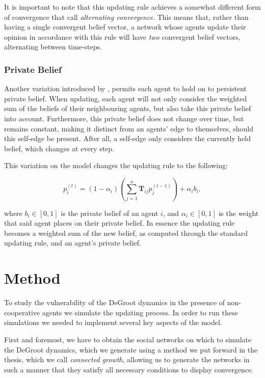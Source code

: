 \documentclass[a4paper, 12pt]{report}
\newcommand{\T}{\bm{T}}
\newcommand{\Tij}{\T_{ij}}
\newcommand{\beli}[3][2]{p_{#2}^{(#3)}}
\begin{document}
It is important to note that this updating rule achieves a somewhat different form of convergence that \cite{amir2021robust} call \emph{alternating convergence}. This means that, rather than having a single convergent belief vector, a network whose agents update their opinion in accordance with this rule will have \emph{two} convergent belief vectors, alternating between time-steps.

\subsection{Private Belief}
\label{updating:private}
Another variation introduced by \cite{friedkin1990private}, permits each agent to hold on to persistent private belief. When updating, each agent will not only consider the weighted sum of the beliefs of their neighbouring agents, but also take this private belief into account. Furthermore, this private belief does not change over time, but remains constant, making it distinct from an agents' edge to themselves, should this self-edge be present. After all, a self-edge only considers the currently held belief, which changes at every step.

This variation on the model changes the updating rule to the following:

\begin{equation*}
    \beli{i}{t} = (1-\alpha_i)(\sum_{j=1}^{n}\Tij\beli{j}{t-1}) + \alpha_i b_i,
\end{equation*}

where $b_i \in [0, 1]$ is the private belief of an agent $i$, and $\alpha_i \in [0, 1]$ is the weight that said agent places on their private belief. In essence the updating rule becomes a weighted sum of the new belief, as computed through the standard updating rule, and an agent's private belief.
 
\newpage


\chapter{Method}
\label{chapter:implementation}

To study the vulnerability of the DeGroot dynamics in the presence of non-cooperative agents we simulate the updating process. In order to run these simulations we needed to implement several key aspects of the model.

First and foremost, we have to obtain the social networks on which to simulate the DeGroot dynamics, which we generate using a method we put forward in the thesis, which we call \emph{connected growth}, allowing us to generate the networks in such a manner that they satisfy all necessary conditions to display convergence.
\end{document}
